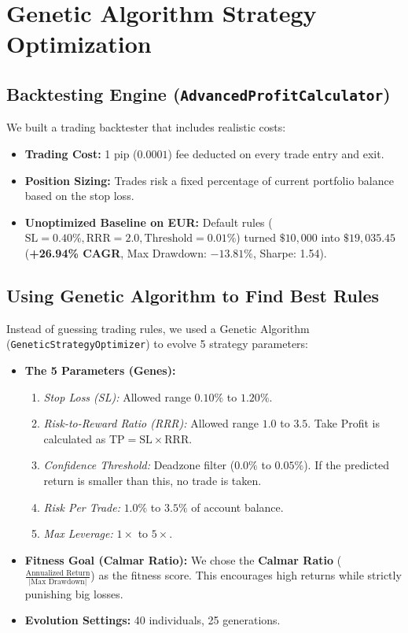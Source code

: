 \section{Genetic Algorithm Strategy Optimization}

\subsection{Backtesting Engine (\texttt{AdvancedProfitCalculator})}
We built a trading backtester that includes realistic costs:
\begin{itemize}[leftmargin=1.5cm, itemsep=1pt]
	\item \textbf{Trading Cost:} 1 pip ($0.0001$) fee deducted on every trade entry and exit.
	\item \textbf{Position Sizing:} Trades risk a fixed percentage of current portfolio balance based on the stop loss.
	\item \textbf{Unoptimized Baseline on EUR:} Default rules ($\text{SL}=0.40\%, \text{RRR}=2.0, \text{Threshold}=0.01\%$) turned $\$10,000$ into $\$19,035.45$ (\textbf{+26.94\% CAGR}, Max Drawdown: \textbf{$-13.81\%$}, Sharpe: 1.54).
\end{itemize}

\subsection{Using Genetic Algorithm to Find Best Rules}
Instead of guessing trading rules, we used a Genetic Algorithm (\texttt{GeneticStrategyOptimizer}) to evolve 5 strategy parameters:
\begin{itemize}[leftmargin=1.5cm, itemsep=1pt]
	\item \textbf{The 5 Parameters (Genes):}
	\begin{enumerate}
		\item \textit{Stop Loss (SL):} Allowed range $0.10\%$ to $1.20\%$.
		\item \textit{Risk-to-Reward Ratio (RRR):} Allowed range $1.0$ to $3.5$. Take Profit is calculated as $\text{TP} = \text{SL} \times \text{RRR}$.
		\item \textit{Confidence Threshold:} Deadzone filter ($0.0\%$ to $0.05\%$). If the predicted return is smaller than this, no trade is taken.
		\item \textit{Risk Per Trade:} $1.0\%$ to $3.5\%$ of account balance.
		\item \textit{Max Leverage:} $1\times$ to $5\times$.
	\end{enumerate}
	\item \textbf{Fitness Goal (Calmar Ratio):} We chose the \textbf{Calmar Ratio} ($\frac{\text{Annualized Return}}{|\text{Max Drawdown}|}$) as the fitness score. This encourages high returns while strictly punishing big losses.
	\item \textbf{Evolution Settings:} 40 individuals, 25 generations.
\end{itemize}

